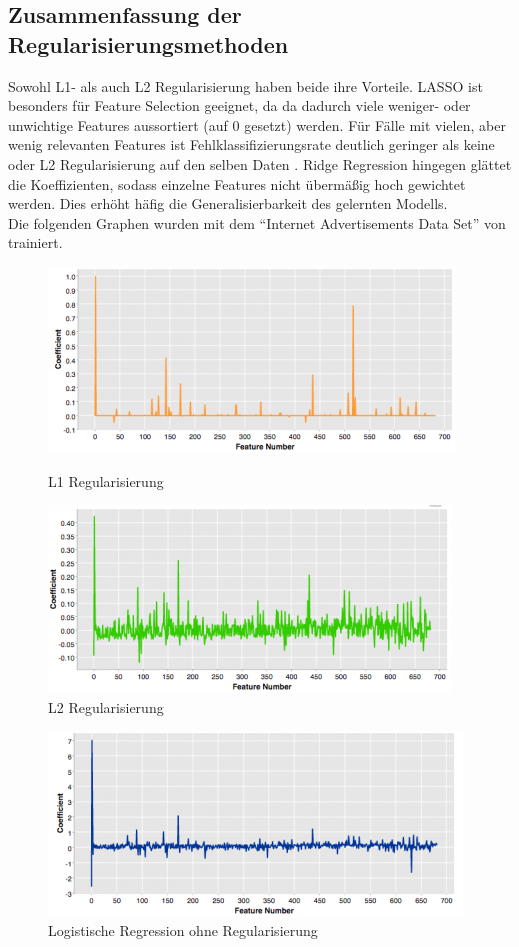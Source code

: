 \subsection{Zusammenfassung der Regularisierungsmethoden}
Sowohl L1- als auch L2 Regularisierung haben beide ihre Vorteile. LASSO ist besonders für Feature Selection geeignet, da da dadurch viele weniger- oder unwichtige Features aussortiert (auf 0 gesetzt) werden. Für Fälle mit vielen, aber wenig relevanten Features ist Fehlklassifizierungsrate deutlich geringer als keine oder L2 Regularisierung auf den selben Daten \cite{NG}. Ridge Regression hingegen glättet die Koeffizienten, sodass einzelne Features nicht übermäßig hoch gewichtet werden. Dies erhöht häfig die Generalisierbarkeit des gelernten Modells.\\
Die folgenden Graphen wurden mit dem "`Internet Advertisements Data Set"' von \cite{DUA2019} trainiert.
\begin{figure}[ht]
\centering
	\begin{minipage}[b]{.4\linewidth}
  		\includegraphics[scale=0.8]{bilder/laplace}
  		\caption{L1 Regularisierung}
  	\end{minipage}
  	\hspace{.1\linewidth}%
  	\begin{minipage}[b]{.4\linewidth}
  		\includegraphics[scale=0.8]{bilder/gauss}
		\caption{L2 Regularisierung}
	\end{minipage}
\end{figure}
\begin{figure}[ht]
\centering
\includegraphics[scale=.8]{bilder/no_reg}
\caption{Logistische Regression ohne Regularisierung}
\end{figure}

